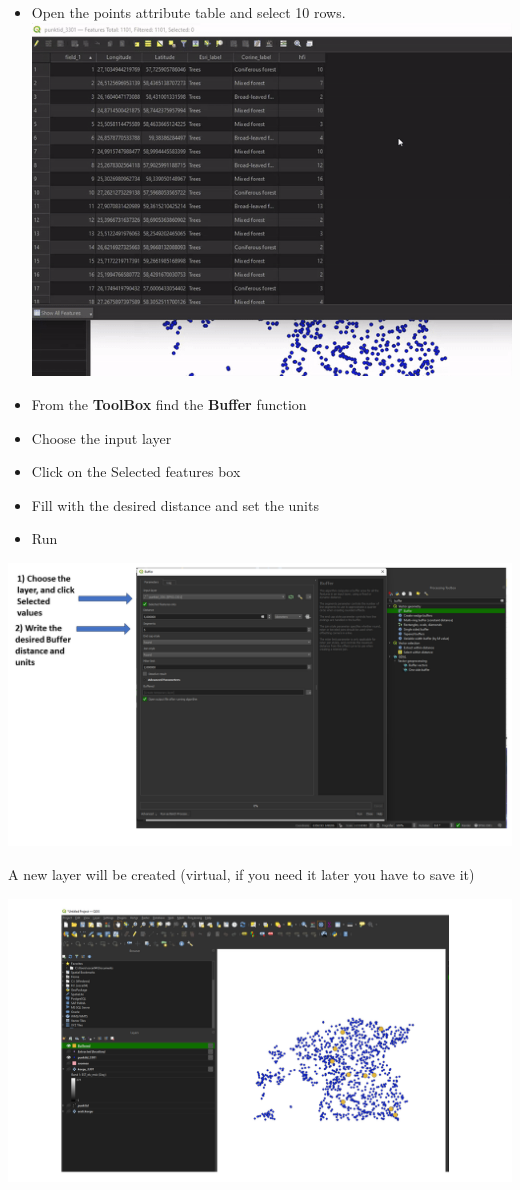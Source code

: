 \documentclass[
  letterpaper,
  DIV=11,
  numbers=noendperiod]{scrartcl}
\begin{document}
\begin{itemize}
\item
  Open the points attribute table and select 10 rows.
  \includegraphics{Lab1/qgis_ss/gif_4.gif}
\item
  From the \textbf{ToolBox} find the \textbf{Buffer} function
\item
  Choose the input layer
\item
  Click on the Selected features box
\item
  Fill with the desired distance and set the units
\item
  Run
\end{itemize}

\includegraphics{Lab1/qgis_ss/QGIS_ss20.png}

A new layer will be created (virtual, if you need it later you have to
save it)

\includegraphics{Lab1/qgis_ss/QGIS_ss21.png}
\end{document}
